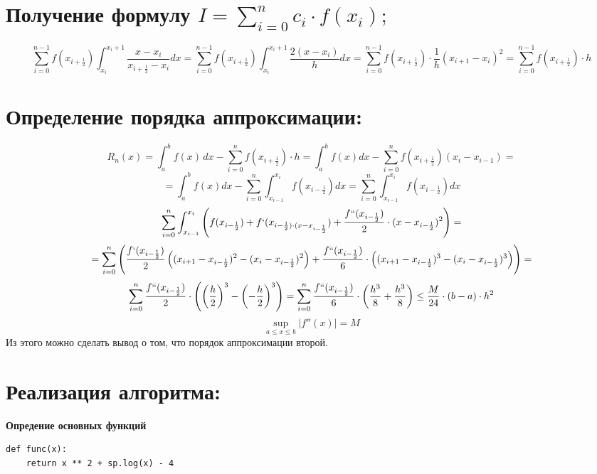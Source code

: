 \documentclass{article}
\begin{document}
\section*{Получение формулу  $ I = \displaystyle\sum_{i=0}^{n} c_i \cdot f(x_i);$}
$$ \displaystyle\sum_{i=0}^{n - 1} f(x_{i + \frac{1}{2}}) \int_{x_i}^{x_i + 1} \frac{x - x_i}{x_{i + \frac{1}{2}} - x_i} dx =  \displaystyle\sum_{i=0}^{n - 1} f(x_{i + \frac{1}{2}}) \int_{x_i}^{x_i + 1} \frac{2 (x - x_i)}{h} dx  =\displaystyle\sum_{i=0}^{n - 1}  f(x_{i + \frac{1}{2}}) \cdot \frac{1}{h} (x_{i + 1} - x_i )^2 = \displaystyle\sum_{i=0}^{n - 1} f(x_{i + \frac{1}{2}}) \cdot h$$

\section*{Определение порядка аппроксимации:}

$$R_n(x) = \int_{a}^{b} f(x) \, dx - \sum_{i=0}^{n} f(x_{i + \frac{1}{2}})\cdot h = \int_{a}^{b} f(x) dx -  \sum_{i=0}^{n} f(x_{i + \frac{1}{2}}) (x_i - x_{i - 1}) = $$
$$ = \int_{a}^{b} f(x) dx -  \sum_{i=0}^{n} \int_{x_{i - 1}}^{x_i} f(x_{i - \frac{1}{2}}) dx =  \sum_{i=0}^{n} \int_{x_{i - 1}}^{x_i} f(x_{i - \frac{1}{2}}) dx $$
$$ \sum_{i=0}^{n} \int_{x_{i - 1}}^{x_i} \left(f(x_{i - \frac{1}{2}}) + f`(x_{i - \frac{1}{2}) \cdot (x - x_{i - \frac{1}{2}}}) + \frac{f``(x_{i - \frac{1}{2}})}{2} \cdot (x - x_{i - \frac{1}{2}})^2  \right) = $$
$$ = \sum_{i=0}^{n} \left( \frac{f`(x_{i - \frac{1}{2}})}{2} \left((x_{i + 1} - x_{i - \frac{1}{2}})^2 - (x_i - x_{i - \frac{1}{2}})^2 \right) + \frac{f``(x_{i - \frac{1}{2}})}{6} \cdot \left((x_{i + 1} - x_{i - \frac{1}{2}})^3 - (x_{i} - x_{i - \frac{1}{2}})^3 \right)\right) = $$
$$\sum_{i=0}^{n} \frac{f``(x_{i - \frac{1}{2}})}{2} \cdot \left( \left(\frac{h}{2} \right)^3 - \left(-\frac{h}{2} \right)^3 \right) = \sum_{i=0}^{n} \frac{f``(x_{i - \frac{1}{2}})}{6} \cdot \left(\frac{h^3}{8} + \frac{h^3}{8} \right) \leq \frac{M}{24} \cdot (b - a) \cdot h^2 $$
$$ \sup\limits_{a \leq x \leq b} |f''(x)| = M $$
Из этого можно сделать вывод о том, что $\textbf{порядок аппроксимации второй}.$
\section*{Реализация алгоритма:}
\textbf{\large{Опредение основных функций}}

\begin{lstlisting}
def func(x):
    return x ** 2 + sp.log(x) - 4
\end{lstlisting}
\end{document}
